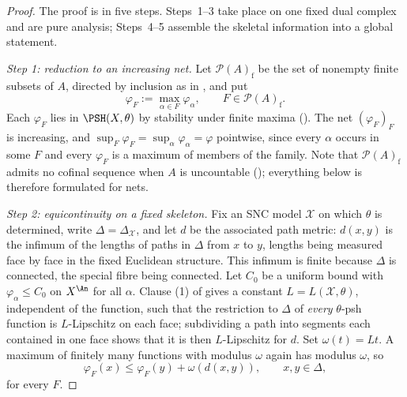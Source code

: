 \begin{proof}
The proof is in five steps.  Steps~1--3 take place on one fixed dual
complex and are pure analysis; Steps~4--5 assemble the skeletal information
into a global statement.

\emph{Step 1: reduction to an increasing net.}  Let $\mathcal P(A)_{\mathrm
f}$ be the set of nonempty finite subsets of $A$, directed by inclusion
as in , and put
\begin{equation}\label{eq:ch23-finite-maxima}
                  \varphi_F:=\max_{\alpha\in F}\varphi_\alpha,
                  \qquad F\in\mathcal P(A)_{\mathrm f}.
\end{equation}
Each $\varphi_F$ lies in $\PSH(X,\theta)$ by stability under finite
maxima ().  The net
$(\varphi_F)_F$ is increasing, and
$\sup_F\varphi_F=\sup_\alpha\varphi_\alpha=\varphi$ pointwise, since every
$\alpha$ occurs in some $F$ and every $\varphi_F$ is a maximum of
members of the family.  Note that $\mathcal P(A)_{\mathrm f}$ admits no
cofinal sequence when $A$ is uncountable
(); everything below is therefore formulated
for nets.

\emph{Step 2: equicontinuity on a fixed skeleton.}  Fix an SNC model
$\mathcal X$ on which $\theta$ is determined, write
$\Delta=\Delta_{\mathcal X}$, and let $d$ be the associated path metric:
$d(x,y)$ is the infimum of the lengths of paths in $\Delta$ from $x$ to
$y$, lengths being measured face by face in the fixed Euclidean structure.
This infimum is finite because $\Delta$ is connected, the special fibre
being connected.  Let $C_0$ be a uniform bound with
$\varphi_\alpha\leq C_0$ on $X^{\An}$ for all $\alpha$.  Clause (1) of
 gives a constant
$L=L(\mathcal X,\theta)$, independent of the function, such that the
restriction to $\Delta$ of \emph{every} $\theta$-psh function is
$L$-Lipschitz on each face; subdividing a path into segments each
contained in one face shows that it is then $L$-Lipschitz for $d$.  Set
$\omega(t)=Lt$.  A maximum of finitely many functions with modulus
$\omega$ again has modulus $\omega$, so
\begin{equation}\label{eq:ch23-common-modulus}
 \varphi_F(x)\leq\varphi_F(y)+\omega(d(x,y)),
 \qquad x,y\in\Delta,
\end{equation}
for every $F$.


\end{proof}
